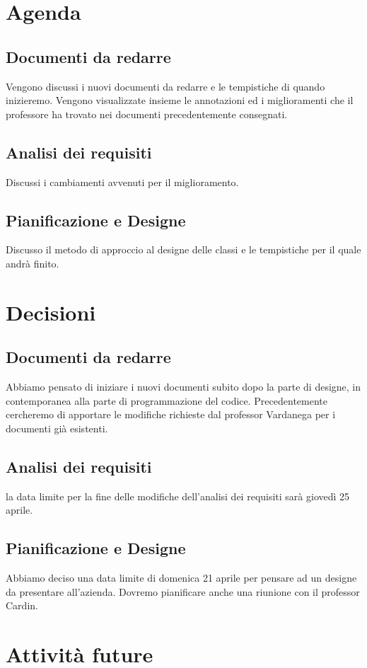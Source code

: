 \documentclass{article}
\begin{document}
\section{Agenda}
\subsection{Documenti da redarre}
Vengono discussi i nuovi documenti da redarre e le tempistiche di quando inizieremo. Vengono visualizzate insieme le annotazioni ed i miglioramenti che il professore ha trovato nei documenti precedentemente consegnati.
\subsection{Analisi dei requisiti}
Discussi i cambiamenti avvenuti per il miglioramento.
\subsection{Pianificazione e Designe}
Discusso il metodo di approccio al designe delle classi e le tempistiche per il quale andrà finito.
\section{Decisioni}
\subsection{Documenti da redarre}
Abbiamo pensato di iniziare i nuovi documenti subito dopo la parte di designe, in contemporanea alla parte di programmazione del codice. Precedentemente cercheremo di apportare le modifiche richieste dal professor Vardanega per i documenti già esistenti.
\subsection{Analisi dei requisiti}
la data limite per la fine delle modifiche dell'analisi dei requisiti sarà giovedì 25 aprile.
\subsection{Pianificazione e Designe}
Abbiamo deciso una data limite di domenica 21 aprile per pensare ad un designe da presentare all'azienda. Dovremo pianificare anche una riunione con il professor Cardin.


\section{Attività future}
\end{document}
